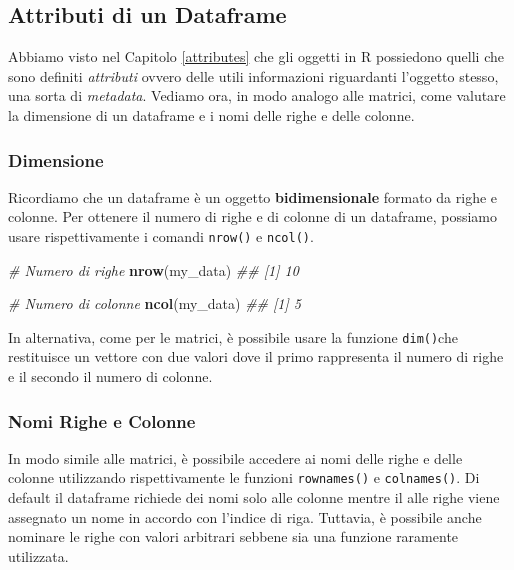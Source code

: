 \documentclass[
]{book}
\newenvironment{Shaded}{\begin{snugshade}}{\end{snugshade}}
\newcommand{\CommentTok}[1]{\textcolor[rgb]{0.56,0.35,0.01}{\textit{#1}}}
\newcommand{\KeywordTok}[1]{\textcolor[rgb]{0.13,0.29,0.53}{\textbf{#1}}}
\newcommand{\NormalTok}[1]{#1}
\begin{document}
\hypertarget{attributi-di-un-dataframe}{%
\subsection{Attributi di un Dataframe}\label{attributi-di-un-dataframe}}

Abbiamo visto nel Capitolo \ref{attributes} che gli oggetti in R possiedono quelli che sono definiti \emph{attributi} ovvero delle utili informazioni riguardanti l'oggetto stesso, una sorta di \emph{metadata}. Vediamo ora, in modo analogo alle matrici, come valutare la dimensione di un dataframe e i nomi delle righe e delle colonne.

\hypertarget{dimensione-2}{%
\subsubsection*{Dimensione}\label{dimensione-2}}

Ricordiamo che un dataframe è un oggetto \textbf{bidimensionale} formato da righe e colonne. Per ottenere il numero di righe e di colonne di un dataframe, possiamo usare rispettivamente i comandi \texttt{nrow()} e \texttt{ncol()}.

\begin{Shaded}
\begin{Highlighting}[]
\CommentTok{# Numero di righe}
\KeywordTok{nrow}\NormalTok{(my_data)}
\CommentTok{## [1] 10}

\CommentTok{# Numero di colonne}
\KeywordTok{ncol}\NormalTok{(my_data)}
\CommentTok{## [1] 5}
\end{Highlighting}
\end{Shaded}

In alternativa, come per le matrici, è possibile usare la funzione \texttt{dim()}che restituisce un vettore con due valori dove il primo rappresenta il numero di righe e il secondo il numero di colonne.

\hypertarget{nomi-righe-e-colonne-1}{%
\subsubsection*{Nomi Righe e Colonne}\label{nomi-righe-e-colonne-1}}

In modo simile alle matrici, è possibile accedere ai nomi delle righe e delle colonne utilizzando rispettivamente le funzioni \texttt{rownames()} e \texttt{colnames()}. Di default il dataframe richiede dei nomi solo alle colonne mentre il alle righe viene assegnato un nome in accordo con l'indice di riga. Tuttavia, è possibile anche nominare le righe con valori arbitrari sebbene sia una funzione raramente utilizzata.
\end{document}
